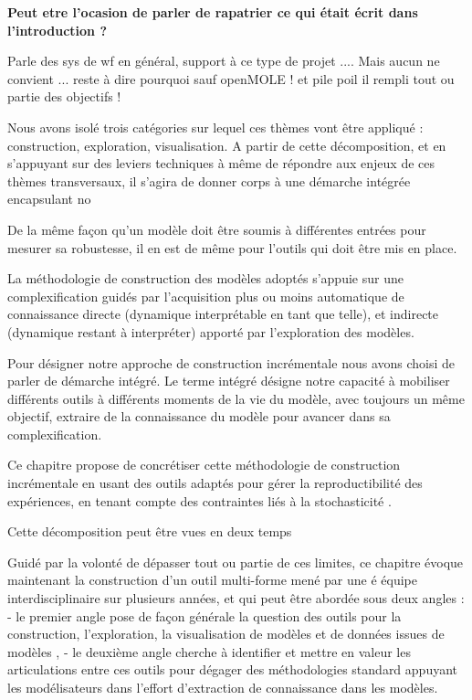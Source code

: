  \textbf{Peut etre l'ocasion de parler de rapatrier ce qui était écrit dans l'introduction ? }
 
 
Parle des sys de wf en général, support à ce type de projet ....
Mais aucun ne convient ... reste à dire pourquoi
sauf openMOLE ! et pile poil il rempli tout ou partie des objectifs ! 

Nous avons isolé trois catégories sur lequel ces thèmes vont être appliqué : construction, exploration, visualisation. A partir de cette décomposition, et en s'appuyant sur des leviers techniques à même de répondre aux enjeux de ces thèmes transversaux, il s'agira de donner corps à une démarche intégrée encapsulant no

De la même façon qu'un modèle doit être soumis à différentes entrées pour mesurer sa robustesse, il en est de même pour l'outils qui doit être mis en place.

La méthodologie de construction des modèles adoptés s'appuie  sur une complexification guidés par l'acquisition plus ou moins automatique de connaissance directe (dynamique interprétable en tant que telle), et indirecte (dynamique restant à interpréter) apporté par l'exploration des modèles. 

Pour désigner notre approche de construction incrémentale nous avons choisi de parler de démarche intégré. Le terme intégré désigne notre capacité à mobiliser différents outils à différents moments de la vie du modèle, avec toujours un même objectif, extraire de la connaissance du modèle pour avancer dans sa complexification.


Ce chapitre propose de concrétiser cette méthodologie de construction incrémentale en usant des outils adaptés pour gérer la reproductibilité des expériences, en tenant compte des contraintes liés à la stochasticité .

Cette décomposition peut être vues en deux temps 

Guidé par la volonté de dépasser tout ou partie de ces limites, ce chapitre évoque maintenant la construction d'un outil multi-forme mené par une é
équipe interdisciplinaire sur plusieurs années, et qui peut être abordée sous deux angles : 
- le premier angle pose de façon générale la question des outils pour la construction, l'exploration, la visualisation de modèles et de données issues de modèles ,
- le deuxième angle cherche à identifier et mettre en valeur les articulations entre ces outils pour dégager des méthodologies standard appuyant les modélisateurs dans l'effort d'extraction de connaissance dans les modèles.

